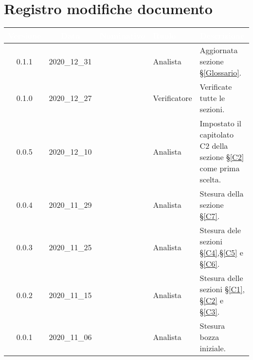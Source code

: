 \section*{Registro modifiche documento}
{
\renewcommand{\arraystretch}{1.5}
\centering

\begin{longtable}{c c C{3cm} C{3cm} C{5cm}}


 \textcolor{white}{\textbf{Versione}} &
    \textcolor{white}{\textbf{Data}} &
    \textcolor{white}{\textbf{Nominativo}} &
    \textcolor{white}{\textbf{Ruolo}} &
    \textcolor{white}{\textbf{Descrizione}}\\	
    \endhead
    
    0.1.1 & 2020\_12\_31 & \TG{} & Analista & Aggiornata sezione \S\ref{Glossario}. \\
    
     0.1.0 & 2020\_12\_27 & \TG{} & Verificatore & Verificate tutte le sezioni. \\
    
    0.0.5 & 2020\_12\_10 & \FF{} & Analista & Impostato il capitolato C2 della sezione \S\ref{C2} come prima scelta.  \\

    0.0.4 & 2020\_11\_29 & \FF{} & Analista & Stesura della sezione \S\ref{C7}.  \\
    
    0.0.3 & 2020\_11\_25 & \FF{} & Analista & Stesura dele sezioni \S\ref{C4},\S \ref{C5} e \S\ref{C6}.  \\
    
    0.0.2 & 2020\_11\_15 & \FF{} & Analista & Stesura delle sezioni \S\ref{C1}, \S\ref{C2} e \S\ref{C3}.  \\
            
    0.0.1 & 2020\_11\_06 & \FF{} & Analista & Stesura bozza iniziale.  \\
			
\end{longtable}
}